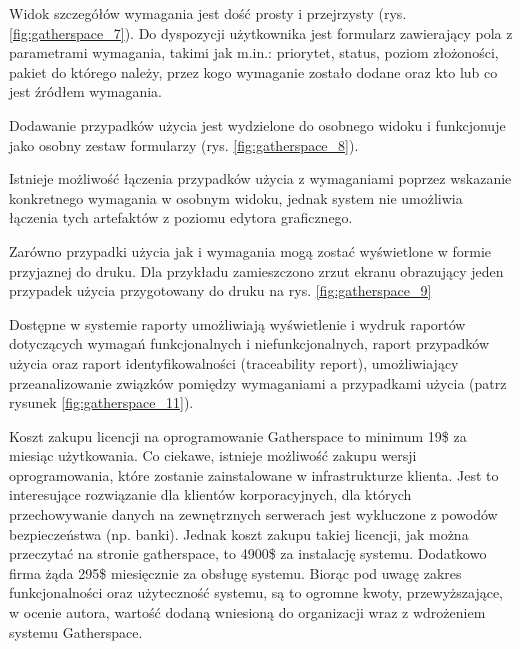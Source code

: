         Widok szczegółów wymagania jest dość prosty i przejrzysty (rys. \ref{fig:gatherspace_7}). Do dyspozycji użytkownika jest formularz zawierający pola z parametrami wymagania, takimi jak m.in.: priorytet, status, poziom złożoności, pakiet do którego należy, przez kogo wymaganie zostało dodane oraz kto lub co jest źródłem wymagania.

        Dodawanie przypadków użycia jest wydzielone do osobnego widoku i funkcjonuje jako osobny zestaw formularzy (rys. \ref{fig:gatherspace_8}). 

        Istnieje możliwość łączenia przypadków użycia z wymaganiami poprzez wskazanie konkretnego wymagania w osobnym widoku, jednak system nie umożliwia łączenia tych artefaktów z poziomu edytora graficznego.

        Zarówno przypadki użycia jak i wymagania mogą zostać wyświetlone w formie przyjaznej do druku. Dla przykładu zamieszczono zrzut ekranu obrazujący jeden przypadek użycia przygotowany do druku na rys. \ref{fig:gatherspace_9}

        Dostępne w systemie raporty umożliwiają wyświetlenie i wydruk raportów dotyczących wymagań funkcjonalnych i niefunkcjonalnych, raport przypadków użycia oraz raport identyfikowalności (traceability report), umożliwiający przeanalizowanie związków pomiędzy wymaganiami a przypadkami użycia (patrz rysunek \ref{fig:gatherspace_11}). 

        \pagebreak

        Koszt zakupu licencji na oprogramowanie Gatherspace to minimum 19\$ za miesiąc użytkowania. Co ciekawe, istnieje możliwość zakupu wersji oprogramowania, które zostanie zainstalowane w infrastrukturze klienta. Jest to interesujące rozwiązanie dla klientów korporacyjnych, dla których przechowywanie danych na zewnętrznych serwerach jest wykluczone z powodów bezpieczeństwa (np. banki). Jednak koszt zakupu takiej licencji, jak można przeczytać na stronie gatherspace, to 4900\$ za instalację systemu. Dodatkowo firma żąda 295\$ miesięcznie za obsługę systemu. Biorąc pod uwagę zakres funkcjonalności oraz użyteczność systemu, są to ogromne kwoty, przewyższające, w ocenie autora, wartość dodaną wniesioną do organizacji wraz z wdrożeniem systemu Gatherspace.
         
